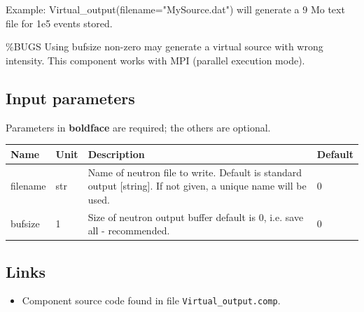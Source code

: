 Example: Virtual\_output(filename="MySource.dat") will generate a 9 Mo text file for 1e5 events stored.

\%BUGS Using bufsize non-zero may generate a virtual source with wrong intensity. This component works with MPI (parallel execution mode).

\subsection*{Input parameters}
Parameters in \textbf{boldface} are required; the others are optional.

\begin{longtable}{p{}p{}p{}p{}}
\toprule
\textbf{Name} & \textbf{Unit} & \textbf{Description} & \textbf{Default} \\
\midrule
\endhead
filename & str & Name of neutron file to write. Default is standard output [string]. If not given, a unique name will be used. & 0 \\
bufsize & 1 & Size of neutron output buffer default is 0, i.e. save all - recommended. & 0 \\
\bottomrule
\end{longtable}

\subsection*{Links}
\begin{itemize}
  \item Component source code found in file \texttt{Virtual\_output.comp}.
\end{itemize}
